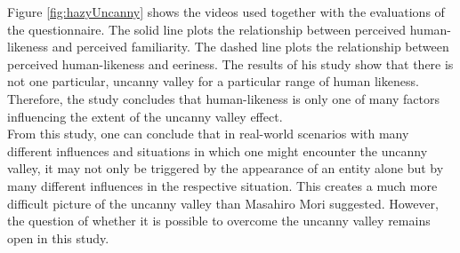 Figure \ref{fig:hazyUncanny} shows the videos used together with the evaluations of the questionnaire. The solid line plots the relationship between perceived human-likeness and perceived familiarity. The dashed line plots the relationship between perceived human-likeness and eeriness. The results of his study show that there is not one particular, uncanny valley for a particular range of human likeness. Therefore, the study concludes that human-likeness is only one of many factors influencing the extent of the uncanny valley effect.\\
From this study, one can conclude that in  real-world scenarios with many different influences and situations in which one might encounter the uncanny valley, it may not only be triggered by the appearance of an entity alone but by many different influences in the respective situation. This creates a much more difficult picture of the uncanny valley than Masahiro Mori suggested. However, the question of whether it is possible to overcome the uncanny valley remains open in this study.

